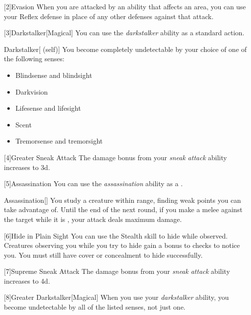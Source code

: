         [2]{Evasion} When you are attacked by an ability that affects an area, you can use your Reflex defense in place of any other defenses against that attack.

        [3]{Darkstalker}[Magical] You can use the \textit{darkstalker} ability as a standard action.
        \begin{attuneability}{Darkstalker}[ (self)]
            You become completely undetectable by your choice of one of the following senses:
            \begin{itemize}
                \item Blindsense and blindsight
                \item Darkvision
                \item Lifesense and lifesight
                \item Scent
                \item Tremorsense and tremorsight
            \end{itemize}
        \end{attuneability}

        [4]{Greater Sneak Attack} The damage bonus from your \textit{sneak attack} ability increases to \plus3d.

        [5]{Assassination} You can use the \textit{assassination} ability as a .
        \begin{freeability}{Assassination}[]
            You study a creature within \rngmed range, finding weak points you can take advantage of.
            Until the end of the next round, if you make a melee  against the target while it is \unaware, your attack deals maximum damage.
        \end{freeability}

        [6]{Hide in Plain Sight} You can use the Stealth skill to hide while observed.
        Creatures observing you while you try to hide gain a  bonus to checks to notice you.
        You must still have cover or concealment to hide successfully.

        [7]{Supreme Sneak Attack} The damage bonus from your \textit{sneak attack} ability increases to \plus4d.

        [8]{Greater Darkstalker}[Magical] When you use your \textit{darkstalker} ability, you become undetectable by all of the listed senses, not just one.

